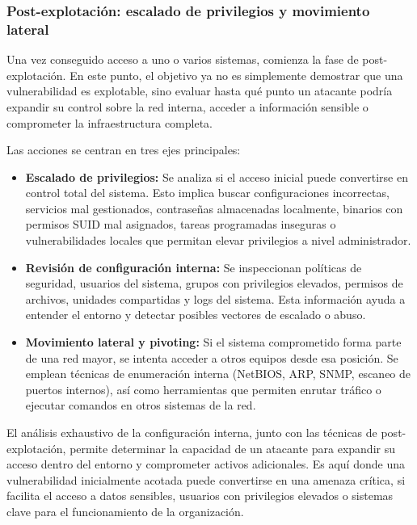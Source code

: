 \documentclass[a4paper, 11pt]{article}
\begin{document}
\subsubsection{Post-explotación: escalado de privilegios y movimiento lateral}

Una vez conseguido acceso a uno o varios sistemas, comienza la fase de post-explotación. En este punto, el objetivo ya no es simplemente demostrar que una vulnerabilidad es explotable, sino evaluar hasta qué punto un atacante podría expandir su control sobre la red interna, acceder a información sensible o comprometer la infraestructura completa.

Las acciones se centran en tres ejes principales:

\begin{itemize}

    \item \textbf{Escalado de privilegios:} Se analiza si el acceso inicial puede convertirse en control total del sistema. Esto implica buscar configuraciones incorrectas, servicios mal gestionados, contraseñas almacenadas localmente, binarios con permisos SUID mal asignados, tareas programadas inseguras o vulnerabilidades locales que permitan elevar privilegios a nivel administrador.
    \item \textbf{Revisión de configuración interna:} Se inspeccionan políticas de seguridad, usuarios del sistema, grupos con privilegios elevados, permisos de archivos, unidades compartidas y logs del sistema. Esta información ayuda a entender el entorno y detectar posibles vectores de escalado o abuso.
    \item \textbf{Movimiento lateral y pivoting:} Si el sistema comprometido forma parte de una red mayor, se intenta acceder a otros equipos desde esa posición. Se emplean técnicas de enumeración interna (NetBIOS, ARP, SNMP, escaneo de puertos internos), así como herramientas que permiten enrutar tráfico o ejecutar comandos en otros sistemas de la red.

\end{itemize}

El análisis exhaustivo de la configuración interna, junto con las técnicas de post-explotación, permite determinar la capacidad de un atacante para expandir su acceso dentro del entorno y comprometer activos adicionales. Es aquí donde una vulnerabilidad inicialmente acotada puede convertirse en una amenaza crítica, si facilita el acceso a datos sensibles, usuarios con privilegios elevados o sistemas clave para el funcionamiento de la organización.
\end{document}
